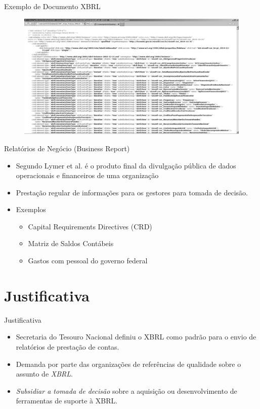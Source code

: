 \documentclass[t,14pt,mathserif]{beamer}
\begin{document}
\begin{frame}{Exemplo de Documento XBRL}
\begin{figure}[htb]
\centering
\includegraphics[width=\textwidth]{../img/arquivo_xsd.eps}
\end{figure}
\end{frame}
\begin{frame}{Relatórios  de Negócio (Business Report)}
    \begin{itemize}
      \item Segundo Lymer et al.\cite{lymer1999business} é o produto final da divulgação
        pública de dados operacionais e financeiros de uma organização
      \item Prestação regular de informações para os gestores para tomada de decisão.
      \item Exemplos
      \begin{itemize}
           \item Capital Requirements Directives (CRD)
           \item Matriz de Saldos Contábeis
           \item Gastos com pessoal do governo federal
      \end{itemize}

    \end{itemize}
\end{frame}

\section{Justificativa}
\begin{frame}{Justificativa}
    \begin{itemize}
      \item Secretaria do Tesouro Nacional definiu o XBRL como padrão para o
        envio de relatórios de prestação de contas.
      \item Demanda por parte das organizações de referências de qualidade
        sobre o assunto de \textit{XBRL}.
      \item \textit{Subsidiar a tomada de decisão} sobre a aquisição ou
        desenvolvimento de ferramentas de suporte à XBRL.
  \end{itemize}
\end{frame}
\end{document}
